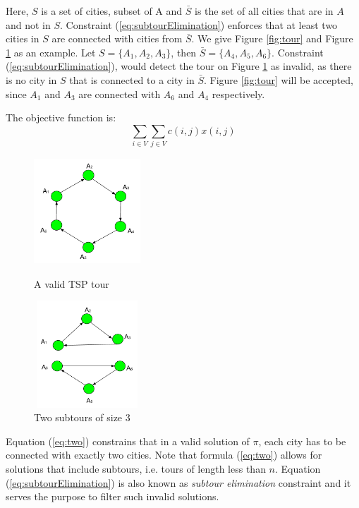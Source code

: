 \documentclass{mprop}
\theoremstyle{definition}
\begin{document}
Here, $S$ is a set of cities, subset of A and $\bar{S}$ is the set of all cities that are in $A$ and not in $S$. Constraint (\ref{eq:subtourElimination}) enforces that at least two cities in $S$ are connected with cities from $\bar{S}$. We give Figure \ref{fig:tour} and Figure \ref{fig:subtours} as an example. Let $S = \{A_{1},A_{2},A_{3}\}$, then $\bar{S} = \{A_{4},A_{5},A_{6}\}$. Constraint (\ref{eq:subtourElimination}), would detect the tour on Figure \ref{fig:subtours} as invalid, as there is no city in $S$ that is connected to a city in $\bar{S}$. Figure \ref{fig:tour} will be accepted, since $A_{1}$ and $A_{3}$ are connected with $A_{6}$ and $A_{4}$ respectively. 

The objective function is:
\begin{equation}
\label{eq:two}
\sum_{i\in V}\sum_{j\in V} c(i,j)x(i,j)
\end{equation}

\begin{figure}
\centering
\begin{minipage}{.5\textwidth}
  \centering
  \includegraphics[width=4cm, height=4cm]{images/valid.png}
  \caption{A valid TSP tour}
  \label{fig:tour}
\end{minipage}%
\begin{minipage}{.5\textwidth}
  \centering
  \includegraphics[width=4cm, height=4cm]{images/invalid.png}
  \caption{Two subtours of size 3}
  \label{fig:subtours}
\end{minipage}
\end{figure}

Equation (\ref{eq:two}) constrains that in a valid solution of $\pi$, each city has to be connected with exactly two cities. Note that formula (\ref{eq:two}) allows for solutions that include subtours, i.e. tours of length less than $n$. Equation (\ref{eq:subtourElimination}) is also known as \textit{subtour elimination} constraint and it serves the purpose to filter such invalid solutions.
\end{document}
